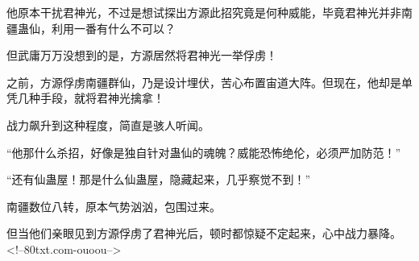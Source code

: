 \begin{this_body}
他原本干扰君神光，不过是想试探出方源此招究竟是何种威能，毕竟君神光并非南疆蛊仙，利用一番有什么不可以？

但武庸万万没想到的是，方源居然将君神光一举俘虏！

之前，方源俘虏南疆群仙，乃是设计埋伏，苦心布置宙道大阵。但现在，他却是单凭几种手段，就将君神光擒拿！

战力飙升到这种程度，简直是骇人听闻。

“他那什么杀招，好像是独自针对蛊仙的魂魄？威能恐怖绝伦，必须严加防范！”

“还有仙蛊屋！那是什么仙蛊屋，隐藏起来，几乎察觉不到！”

南疆数位八转，原本气势汹汹，包围过来。

但当他们亲眼见到方源俘虏了君神光后，顿时都惊疑不定起来，心中战力暴降。<!--80txt.com-ouoou-->

\end{this_body}


